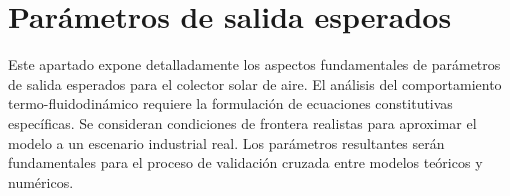 \section{Parámetros de salida esperados}
\label{sec:cap06_parametros}

Este apartado expone detalladamente los aspectos fundamentales de parámetros de salida esperados para el colector solar de aire.
El análisis del comportamiento termo-fluidodinámico requiere la formulación de ecuaciones constitutivas específicas.
Se consideran condiciones de frontera realistas para aproximar el modelo a un escenario industrial real.
Los parámetros resultantes serán fundamentales para el proceso de validación cruzada entre modelos teóricos y numéricos.
